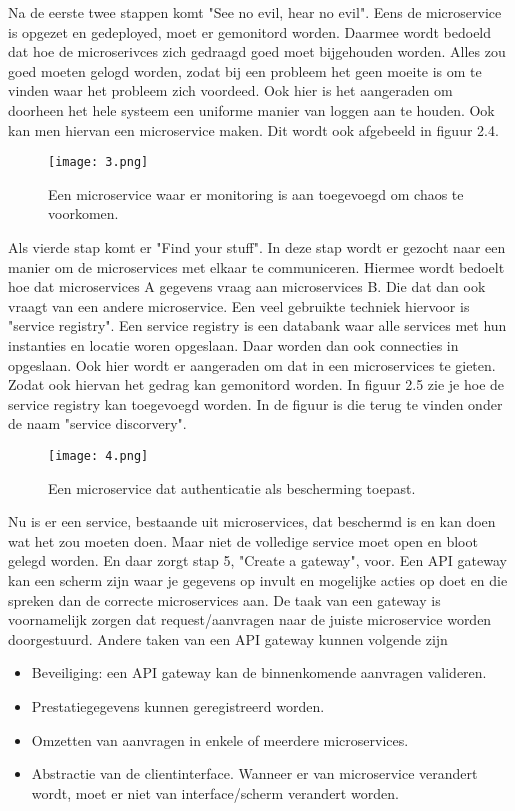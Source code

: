 Na de eerste twee stappen komt "See no evil, hear no evil". Eens de microservice is opgezet en gedeployed, moet er gemonitord worden. Daarmee wordt bedoeld dat hoe de microserivces zich gedraagd goed moet bijgehouden worden. Alles zou goed moeten gelogd worden, zodat bij een probleem het geen moeite is om te vinden waar het probleem zich voordeed. Ook hier is het aangeraden om doorheen het hele systeem een uniforme manier van loggen aan te houden. Ook kan men hiervan een microservice maken. Dit wordt ook afgebeeld in figuur 2.4.
\begin{figure}[h]
	\texttt{[image: 3.png]}
	\caption{Een microservice waar er monitoring is aan toegevoegd om chaos te voorkomen. \textcite{Benetis2016}}
	\centering
\end{figure}

Als vierde stap komt er "Find your stuff". In deze stap wordt er gezocht naar een manier om de microservices met elkaar te communiceren. Hiermee wordt bedoelt hoe dat microservices A gegevens vraag aan microservices B. Die dat dan ook vraagt van een andere microservice. Een veel gebruikte techniek hiervoor is "service registry". Een service registry is een databank waar alle services met hun instanties en locatie woren opgeslaan. Daar worden dan ook connecties in opgeslaan. Ook hier wordt er aangeraden om dat in een microservices te gieten. Zodat ook hiervan het gedrag kan gemonitord worden. In figuur 2.5 zie je hoe de service registry kan toegevoegd worden. In de figuur is die terug te vinden onder de naam "service discorvery".
\begin{figure}[h]
	\texttt{[image: 4.png]}
	\caption{Een microservice dat authenticatie als bescherming toepast. \textcite{Benetis2016}}
	\centering
\end{figure}

Nu is er een service, bestaande uit microservices, dat beschermd is en kan doen wat het zou moeten doen. Maar niet de  volledige service moet open en bloot gelegd worden. En daar zorgt stap 5, "Create a gateway", voor. Een API gateway kan een scherm zijn waar je gegevens op invult en mogelijke acties op doet en die spreken dan de correcte microservices aan. De taak van een gateway is voornamelijk zorgen dat request/aanvragen naar de juiste microservice worden doorgestuurd. Andere taken van een API gateway kunnen volgende zijn
\begin{itemize}
	\item Beveiliging: een API gateway kan de binnenkomende aanvragen valideren. 
	\item Prestatiegegevens kunnen geregistreerd worden.
	\item Omzetten van aanvragen in enkele of meerdere microservices.
	\item Abstractie van de clientinterface. Wanneer er van microservice verandert wordt, moet er niet van interface/scherm verandert worden. 
\end{itemize}

